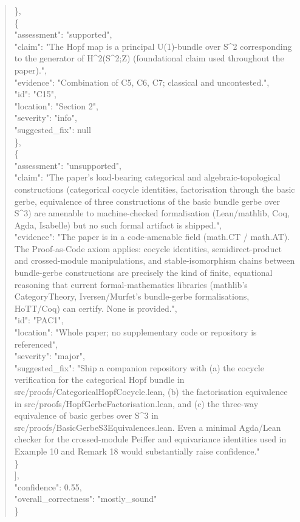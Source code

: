 \documentclass[11pt]{article}
\begin{document}
\begin{quote}
    \},\\
    \{\\
      "assessment": "supported",\\
      "claim": "The Hopf map is a principal U(1)-bundle over S\^{}2 corresponding to the generator of H\^{}2(S\^{}2;Z) (foundational claim used throughout the paper).",\\
      "evidence": "Combination of C5, C6, C7; classical and uncontested.",\\
      "id": "C15",\\
      "location": "Section 2",\\
      "severity": "info",\\
      "suggested\_fix": null\\
    \},\\
    \{\\
      "assessment": "unsupported",\\
      "claim": "The paper's load-bearing categorical and algebraic-topological constructions (categorical cocycle identities, factorisation through the basic gerbe, equivalence of three constructions of the basic bundle gerbe over S\^{}3) are amenable to machine-checked formalisation (Lean/mathlib, Coq, Agda, Isabelle) but no such formal artifact is shipped.",\\
      "evidence": "The paper is in a code-amenable field (math.CT / math.AT). The Proof-as-Code axiom applies: cocycle identities, semidirect-product and crossed-module manipulations, and stable-isomorphism chains between bundle-gerbe constructions are precisely the kind of finite, equational reasoning that current formal-mathematics libraries (mathlib's CategoryTheory, Iversen/Murfet's bundle-gerbe formalisations, HoTT/Coq) can certify. None is provided.",\\
      "id": "PAC1",\\
      "location": "Whole paper; no supplementary code or repository is referenced",\\
      "severity": "major",\\
      "suggested\_fix": "Ship a companion repository with (a) the cocycle verification for the categorical Hopf bundle in src/proofs/CategoricalHopfCocycle.lean, (b) the factorisation equivalence in src/proofs/HopfGerbeFactorisation.lean, and (c) the three-way equivalence of basic gerbes over S\^{}3 in src/proofs/BasicGerbeS3Equivalences.lean. Even a minimal Agda/Lean checker for the crossed-module Peiffer and equivariance identities used in Example 10 and Remark 18 would substantially raise confidence."\\
    \}\\
  ],\\
  "confidence": 0.55,\\
  "overall\_correctness": "mostly\_sound"\\
\}\\
\end{quote}
\end{document}
